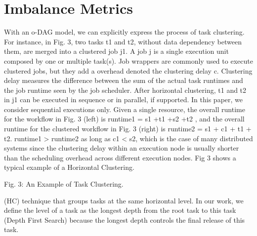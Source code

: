 

\section{Imbalance Metrics}
\label{sec:imbalance}

With an o-DAG model, we can explicitly express the process of task clustering. For instance, in Fig. 3, two tasks t1 and t2, without data dependency between them, are merged into a clustered job j1. A job j is a single execution unit composed by one or multiple task(s). Job wrappers are commonly used to execute clustered jobs, but they add a overhead denoted the clustering delay c. Clustering delay measures the difference between the sum of the actual task runtimes and the job runtime seen by the job scheduler. After horizontal clustering, t1 and t2 in j1 can be executed in sequence or in parallel, if supported. In this paper, we consider sequential executions only. Given a single resource, the overall runtime for the workflow in Fig. 3 (left) is runtime1 = s1 +t1 +s2 +t2 , and the overall runtime for the clustered workflow in Fig. 3 (right) is runtime2 = s1 + c1 + t1 + t2. runtime1 > runtime2 as long as c1 < s2, which is the case of many distributed systems since the clustering delay within an execution node is usually shorter than the scheduling overhead across different execution nodes.
Fig 3 shows a typical example of a Horizontal Clustering. 

Fig. 3: An Example of Task Clustering.

(HC) technique that groups tasks at the same horizontal level. In our work, we define the level of a task as the longest depth from the root task to this task (Depth First Search) because the longest depth controls the final release of this task.




